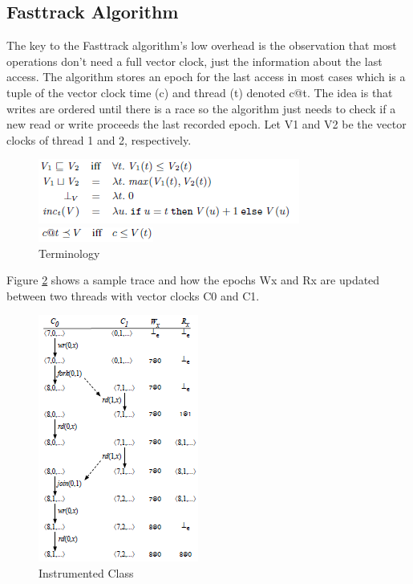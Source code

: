 \documentclass{acm_proc_article-sp}
\begin{document}
\subsection{Fasttrack Algorithm}
The key to the Fasttrack algorithm's low overhead is the observation that most operations don't need a full vector clock, just the information about the last access. The algorithm stores an epoch for the last access in most cases which is a tuple of the vector clock time (c)  and thread (t) denoted c@t. The idea is that writes are ordered until there is a race so the algorithm just needs to check if a new read or write proceeds the last recorded epoch. Let V1 and V2 be the vector clocks of thread 1 and 2, respectively.
 \begin{figure}[h]
    \centering
    \begin{minipage} [b] {8cm}
      \includegraphics[scale=1]{termin}
    \end{minipage}
    \begin{minipage} [b] {7cm}
      \includegraphics[scale=1]{lessthan}
	\caption{Terminology\label{termin}}
    \end{minipage}
  \end{figure}
Figure \ref{trace} shows a sample trace and how the epochs Wx and Rx are updated between two threads with vector clocks C0 and C1.
 \begin{figure}[h]
    \centering
    \begin{minipage} [b] {7.5cm}
      \includegraphics[scale=1]{full_trace}
      \caption{Instrumented Class\label{trace}}
    \end{minipage}
  \end{figure} 
\end{document}
